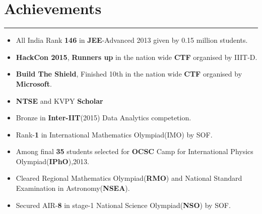 \documentclass[a4paper]{article}
\begin{document}
 \section*{Achievements}
 \hrule
 \vspace{3mm}
  \begin{itemize}
   \setlength\itemsep{-0.2em}
   \item All India Rank \textbf{146} in \textbf{JEE}-Advanced 2013 given by 0.15 million students.
   \item \textbf{HackCon 2015}, \textbf{Runners up} in the nation wide \textbf{CTF} organised by IIIT-D.
   \item \textbf{Build The Shield}, Finished 10th in the nation wide \textbf{CTF} organised by \textbf{Microsoft}.
   \item \textbf{NTSE} and KVPY \textbf{Scholar} 
   \item Bronze in \textbf{Inter-IIT}(2015) Data Analytics competetion.
   \item Rank-\textbf{1} in International Mathematics Olympiad(IMO) by SOF.
   \item Among final \textbf{35} students selected for \textbf{OCSC} Camp for International Physics Olympiad(\textbf{IPhO}),2013.
   \item Cleared Regional Mathematics Olympiad(\textbf{RMO}) and National Standard Examination in Astronomy(\textbf{NSEA}).
   \item Secured AIR-\textbf{8} in stage-1 National Science Olympiad(\textbf{NSO}) by SOF.
  \end{itemize}
 
 
\end{document}
